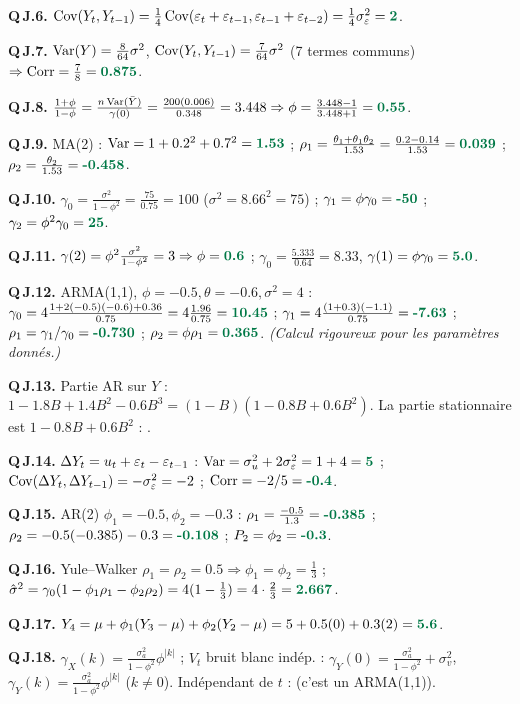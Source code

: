 \documentclass[11pt]{article}
\begin{document}
\textbf{Q\,J.6.} $\Cov(Y_t,Y_{t-1})=\frac14\Cov(\eps_t+\eps_{t-1},\eps_{t-1}+\eps_{t-2})
=\frac14\sigma_\eps^2=\bonne{2}$.

\textbf{Q\,J.7.} $\operatorname{Var}(Y)=\frac{8}{64}\sigma^2$, $\operatorname{Cov}(Y_t,Y_{t-1})=\frac{7}{64}\sigma^2$ (7
termes communs) $\Rightarrow\Corr=\frac78=\bonne{0.875}$.

\textbf{Q\,J.8.} $\frac{1+\phi}{1-\phi}=\frac{n\Var(\bar Y)}{\gamma(0)}=\frac{200(0.006)}{0.348}
=3.448\Rightarrow\phi=\frac{3.448-1}{3.448+1}=\bonne{0.55}$.

\textbf{Q\,J.9.} MA(2) : $\Var=1+0.2^2+0.7^2=\bonne{1.53}$ ;
$\rho_1=\frac{\theta_1+\theta_1\theta_2}{1.53}=\frac{0.2-0.14}{1.53}=\bonne{0.039}$ ;
$\rho_2=\frac{\theta_2}{1.53}=\bonne{-0.458}$.

\textbf{Q\,J.10.} $\gamma_0=\frac{\sigma^2}{1-\phi^2}=\frac{75}{0.75}=100$ ($\sigma^2=8.66^2=75$) ;
$\gamma_1=\phi\gamma_0=\bonne{-50}$ ; $\gamma_2=\phi^2\gamma_0=\bonne{25}$.

\textbf{Q\,J.11.} $\gamma(2)=\phi^2\frac{\sigma^2}{1-\phi^2}=3\Rightarrow\phi=\bonne{0.6}$ ;
$\gamma_0=\frac{5.333}{0.64}=8.33$, $\gamma(1)=\phi\gamma_0=\bonne{5.0}$.

\textbf{Q\,J.12.} ARMA(1,1), $\phi=-0.5,\theta=-0.6,\sigma^2=4$ :
$\gamma_0=4\frac{1+2(-0.5)(-0.6)+0.36}{0.75}=4\frac{1.96}{0.75}=\bonne{10.45}$ ;
$\gamma_1=4\frac{(1+0.3)(-1.1)}{0.75}=\bonne{-7.63}$ ;
$\rho_1=\gamma_1/\gamma_0=\bonne{-0.730}$ ; $\rho_2=\phi\rho_1=\bonne{0.365}$.
\emph{(Calcul rigoureux pour les paramètres donnés.)}

\textbf{Q\,J.13.} Partie AR sur $Y$ : $1-1.8B+1.4B^2-0.6B^3=(1-B)(1-0.8B+0.6B^2)$. La partie
stationnaire est $1-0.8B+0.6B^2$ : .

\textbf{Q\,J.14.} $\Delta Y_t=u_t+\varepsilon_t-\varepsilon_{t-1}$ : $\Var=\sigma_u^2+2\sigma_\eps^2=1+4=\bonne{5}$ ;
$\operatorname{Cov}(\Delta Y_t,\Delta Y_{t-1})=-\sigma_\varepsilon^2=-2$ ; $\Corr=-2/5=\bonne{-0.4}$.

\textbf{Q\,J.15.} AR(2) $\phi_1=-0.5,\phi_2=-0.3$ :
$\rho_1=\frac{-0.5}{1.3}=\bonne{-0.385}$ ; $\rho_2=-0.5(-0.385)-0.3=\bonne{-0.108}$ ;
$P_2=\phi_2=\bonne{-0.3}$.

\textbf{Q\,J.16.} Yule--Walker $\rho_1=\rho_2=0.5\Rightarrow\phi_1=\phi_2=\frac13$ ;
$\hat\sigma^2=\gamma_0(1-\phi_1\rho_1-\phi_2\rho_2)=4(1-\tfrac13)=4\cdot\tfrac23=\bonne{2.667}$.

\textbf{Q\,J.17.} $Y_4=\mu+\phi_1(Y_3-\mu)+\phi_2(Y_2-\mu)=5+0.5(0)+0.3(2)=\bonne{5.6}$.

\textbf{Q\,J.18.} $\gamma_X(k)=\frac{\sigma_a^2}{1-\phi^2}\phi^{|k|}$ ; $V_t$ bruit blanc indép. :
$\gamma_Y(0)=\frac{\sigma_a^2}{1-\phi^2}+\sigma_v^2$, $\gamma_Y(k)=\frac{\sigma_a^2}{1-\phi^2}\phi^{|k|}$
($k\ne0$). Indépendant de $t$ :  (c'est un ARMA(1,1)).
\end{document}
